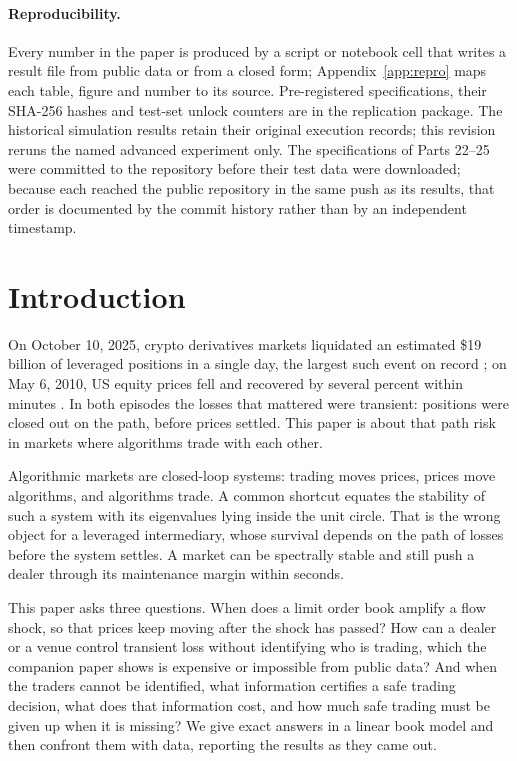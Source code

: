 \documentclass[12pt]{article}
\theoremstyle{definition}
\theoremstyle{remark}
\begin{document}
\paragraph{Reproducibility.} Every number in the paper is produced by a script or notebook cell that writes a result file from public data or from a closed form; Appendix~\ref{app:repro} maps each table, figure and number to its source. Pre-registered specifications, their SHA-256 hashes and test-set unlock counters are in the replication package. The historical simulation results retain their original execution records; this revision reruns the named advanced experiment only. The specifications of Parts 22--25 were committed to the repository before their test data were downloaded; because each reached the public repository in the same push as its results, that order is documented by the commit history rather than by an independent timestamp.

\newpage
\setcounter{page}{1}

\section{Introduction}

On October 10, 2025, crypto derivatives markets liquidated an estimated \$19 billion of leveraged positions in a single day, the largest such event on record \citep{shares2025}; on May 6, 2010, US equity prices fell and recovered by several percent within minutes \citep{kirilenko2017}. In both episodes the losses that mattered were transient: positions were closed out on the path, before prices settled. This paper is about that path risk in markets where algorithms trade with each other.

Algorithmic markets are closed-loop systems: trading moves prices, prices move algorithms, and algorithms trade. A common shortcut equates the stability of such a system with its eigenvalues lying inside the unit circle. That is the wrong object for a leveraged intermediary, whose survival depends on the path of losses before the system settles. A market can be spectrally stable and still push a dealer through its maintenance margin within seconds.

This paper asks three questions. When does a limit order book amplify a flow shock, so that prices keep moving after the shock has passed? How can a dealer or a venue control transient loss without identifying who is trading, which the companion paper \citep{niroula2026} shows is expensive or impossible from public data? And when the traders cannot be identified, what information certifies a safe trading decision, what does that information cost, and how much safe trading must be given up when it is missing? We give exact answers in a linear book model and then confront them with data, reporting the results as they came out.
\end{document}
